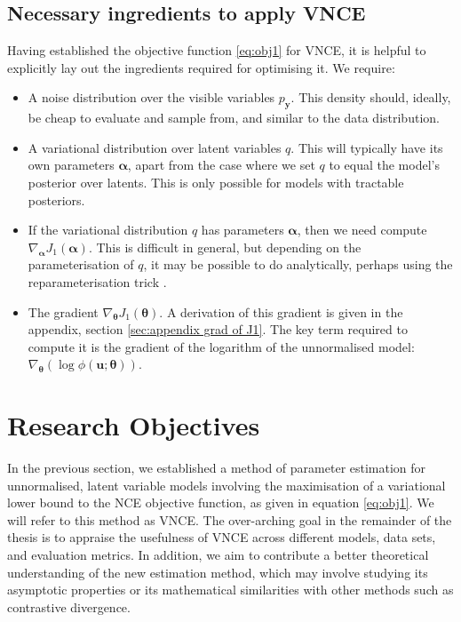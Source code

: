 \documentclass[11pt, oneside]{article}
\newcommand{\thetab}{{\boldsymbol{\theta}}}
\newcommand{\alphab}{{\boldsymbol{\alpha}}}
\newcommand{\pnoise}{p_{ \mathbf y}}
\renewcommand{\u}{{\mathbf u}}
\theoremstyle{definition}
\begin{document}
\subsection{Necessary ingredients to apply VNCE}
\label{sec:optimisation of var objective}
Having established the objective function \ref{eq:obj1} for VNCE, it is helpful to explicitly lay out the ingredients required for optimising it. We require:
\begin{itemize}
    \item A noise distribution over the visible variables $\pnoise$. This density should, ideally, be cheap to evaluate and sample from, and similar to the data distribution.
    \item A variational distribution over latent variables $q$. This will typically have its own parameters $\alphab$, apart from the case where we set $q$ to equal the model's posterior over latents. This is only possible for models with tractable posteriors. 
    \item If the variational distribution $q$ has parameters $\alphab$, then we need compute $\nabla_{\alphab} J_1(\alphab)$. This is difficult in general, but depending on the parameterisation of $q$, it may be possible to do analytically, perhaps using the reparameterisation trick \citep{kingma2015variational}.
    \item The gradient $\nabla_{\thetab} J_1(\thetab)$. A derivation of this gradient is given in the appendix, section \ref{sec:appendix grad of J1}. The key term required to compute it is the gradient of the logarithm of the unnormalised model: $\nabla_{\thetab}(\log \phi(\u; \thetab))$.
\end{itemize}


\newpage
\section{Research Objectives}
\label{sec:research objectives}
In the previous section, we established a method of parameter estimation for unnormalised, latent variable models involving the maximisation of a variational lower bound to the NCE objective function, as given in equation \ref{eq:obj1}. We will refer to this method as VNCE. The over-arching goal in the remainder of the thesis is to appraise the usefulness of VNCE across different models, data sets, and evaluation metrics. In addition, we aim to contribute a better theoretical understanding of the new estimation method, which may involve studying its asymptotic properties or its mathematical similarities with other methods such as contrastive divergence.
\end{document}
